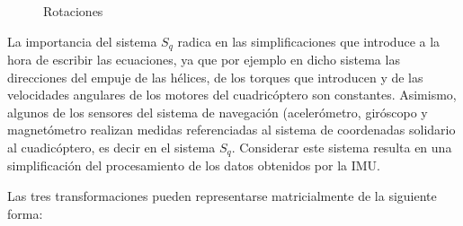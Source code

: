 \documentclass[main]{subfiles}
\begin{document}
\begin{figure} [h!]
  \centering
  \caption{Rotaciones}
  \label{fig:rotaciones}
\end{figure}

La importancia del sistema $S_q$ radica en las simplificaciones que introduce a la hora de escribir las ecuaciones, ya que por ejemplo en dicho sistema las direcciones del empuje de las h\'elices, de los torques que introducen y de las velocidades angulares de los motores del cuadric\'optero son constantes. Asimismo, algunos de los sensores del sistema de navegaci\'on (aceler\'ometro, gir\'oscopo y magnet\'ometro realizan medidas referenciadas al sistema de coordenadas solidario al cuadic\'optero, es decir en el sistema $S_q$. Considerar este sistema resulta en una simplificaci\'on del procesamiento de los datos obtenidos por la IMU. 

Las tres transformaciones pueden representarse matricialmente de la siguiente forma: 
\end{document}
